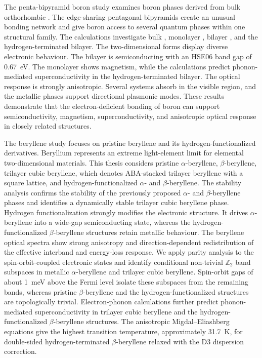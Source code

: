 The penta-bipyramid boron study examines boron phases derived from bulk orthorhombic .
The edge-sharing pentagonal bipyramids create an unusual bonding network and give boron access to several quantum phases within one structural family.
The calculations investigate bulk , monolayer , bilayer , and the hydrogen-terminated bilayer.
The two-dimensional forms display diverse electronic behaviour.
The bilayer is semiconducting with an HSE06 band gap of \qty{0.67}{\electronvolt}.
The monolayer shows magnetism, while the calculations predict phonon-mediated superconductivity in the hydrogen-terminated bilayer.
The optical response is strongly anisotropic.
Several systems absorb in the visible region, and the metallic phases support directional plasmonic modes.
These results demonstrate that the electron-deficient bonding of boron can support semiconductivity, magnetism, superconductivity, and anisotropic optical response in closely related structures.

The beryllene study focuses on pristine beryllene and its hydrogen-functionalized derivatives.
Beryllium represents an extreme light-element limit for elemental two-dimensional materials.
This thesis considers pristine $\alpha$-beryllene, $\beta$-beryllene, trilayer cubic beryllene, which denotes ABA-stacked trilayer beryllene with a square lattice, and hydrogen-functionalized $\alpha$- and $\beta$-beryllene.
The stability analysis confirms the stability of the previously proposed $\alpha$- and $\beta$-beryllene phases and identifies a dynamically stable trilayer cubic beryllene phase.
Hydrogen functionalization strongly modifies the electronic structure.
It drives $\alpha$-beryllene into a wide-gap semiconducting state, whereas the hydrogen-functionalized $\beta$-beryllene structures retain metallic behaviour.
The beryllene optical spectra show strong anisotropy and direction-dependent redistribution of the effective interband and energy-loss response.
We apply parity analysis to the spin-orbit-coupled electronic states and identify conditional non-trivial $\mathbb{Z}_2$ band subspaces in metallic $\alpha$-beryllene and trilayer cubic beryllene.
Spin-orbit gaps of about \qty{1}{\milli\electronvolt} above the Fermi level isolate these subspaces from the remaining bands, whereas pristine $\beta$-beryllene and the hydrogen-functionalized structures are topologically trivial.
Electron-phonon calculations further predict phonon-mediated superconductivity in trilayer cubic beryllene and the hydrogen-functionalized $\beta$-beryllene structures.
The anisotropic Migdal--Eliashberg equations give the highest transition temperature, approximately \qty{31.7}{\kelvin}, for double-sided hydrogen-terminated $\beta$-beryllene relaxed with the D3 dispersion correction.

